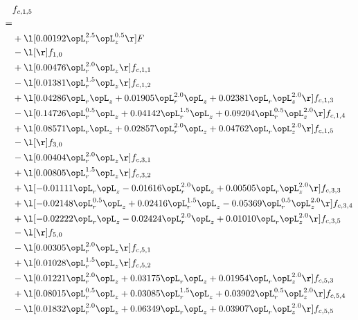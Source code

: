 \begin{alignat}{2} 
\label{eq:f_15_1} 
& f_{c,1,5} \nonumber \\ 
 = \\ 
& + \l[  0.00192 \opL_r^{2.5} \opL_z^{0.5}  \r] F \nonumber \\ 
& - \l[  \r] f_{1,0} \nonumber \\ 
& + \l[  0.00476 \opL_r^{2.0} \opL_z  \r] f_{c,1,1} \nonumber \\ 
& - \l[  0.01381 \opL_r^{1.5} \opL_z  \r] f_{c,1,2} \nonumber \\ 
& + \l[  0.04286 \opL_r \opL_z +  0.01905 \opL_r^{2.0} \opL_z +  0.02381 \opL_r \opL_z^{2.0}  \r] f_{c,1,3} \nonumber \\ 
& - \l[  0.14726 \opL_r^{0.5} \opL_z +  0.04142 \opL_r^{1.5} \opL_z +  0.09204 \opL_r^{0.5} \opL_z^{2.0}  \r] f_{c,1,4} \nonumber \\ 
& + \l[  0.08571 \opL_r \opL_z +  0.02857 \opL_r^{2.0} \opL_z +  0.04762 \opL_r \opL_z^{2.0}  \r] f_{c,1,5} \nonumber \\ 
& - \l[  \r] f_{3,0} \nonumber \\ 
& - \l[  0.00404 \opL_r^{2.0} \opL_z  \r] f_{c,3,1} \nonumber \\ 
& + \l[  0.00805 \opL_r^{1.5} \opL_z  \r] f_{c,3,2} \nonumber \\ 
& + \l[  -0.01111 \opL_r \opL_z   -0.01616 \opL_r^{2.0} \opL_z +  0.00505 \opL_r \opL_z^{2.0}  \r] f_{c,3,3} \nonumber \\ 
& + \l[  -0.02148 \opL_r^{0.5} \opL_z +  0.02416 \opL_r^{1.5} \opL_z   -0.05369 \opL_r^{0.5} \opL_z^{2.0}  \r] f_{c,3,4} \nonumber \\ 
& + \l[  -0.02222 \opL_r \opL_z   -0.02424 \opL_r^{2.0} \opL_z +  0.01010 \opL_r \opL_z^{2.0}  \r] f_{c,3,5} \nonumber \\ 
& - \l[  \r] f_{5,0} \nonumber \\ 
& - \l[  0.00305 \opL_r^{2.0} \opL_z  \r] f_{c,5,1} \nonumber \\ 
& + \l[  0.01028 \opL_r^{1.5} \opL_z  \r] f_{c,5,2} \nonumber \\ 
& - \l[  0.01221 \opL_r^{2.0} \opL_z +  0.03175 \opL_r \opL_z +  0.01954 \opL_r \opL_z^{2.0}  \r] f_{c,5,3} \nonumber \\ 
& + \l[  0.08015 \opL_r^{0.5} \opL_z +  0.03085 \opL_r^{1.5} \opL_z +  0.03902 \opL_r^{0.5} \opL_z^{2.0}  \r] f_{c,5,4} \nonumber \\ 
& - \l[  0.01832 \opL_r^{2.0} \opL_z +  0.06349 \opL_r \opL_z +  0.03907 \opL_r \opL_z^{2.0}  \r] f_{c,5,5} \nonumber \\ 

\end{alignat}
